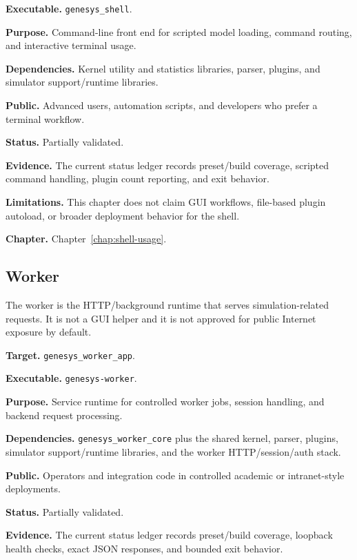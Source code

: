 \noindent\textbf{Executable.} \texttt{genesys\_shell}.

\noindent\textbf{Purpose.} Command-line front end for scripted model loading, command routing, and interactive terminal usage.

\noindent\textbf{Dependencies.} Kernel utility and statistics libraries, parser, plugins, and simulator support/runtime libraries.

\noindent\textbf{Public.} Advanced users, automation scripts, and developers who prefer a terminal workflow.

\noindent\textbf{Status.} Partially validated.

\noindent\textbf{Evidence.} The current status ledger records preset/build coverage, scripted command handling, plugin count reporting, and exit behavior.

\noindent\textbf{Limitations.} This chapter does not claim GUI workflows, file-based plugin autoload, or broader deployment behavior for the shell.

\noindent\textbf{Chapter.} Chapter~\ref{chap:shell-usage}.

\subsection{Worker}
\label{subsec:application-overview-worker}

The worker is the HTTP/background runtime that serves simulation-related
requests. It is not a GUI helper and it is not approved for public Internet
exposure by default.

\noindent\textbf{Target.} \texttt{genesys\_worker\_app}.

\noindent\textbf{Executable.} \texttt{genesys-worker}.

\noindent\textbf{Purpose.} Service runtime for controlled worker jobs, session handling, and backend request processing.

\noindent\textbf{Dependencies.} \texttt{genesys\_worker\_core} plus the shared kernel, parser, plugins, simulator support/runtime libraries, and the worker HTTP/session/auth stack.

\noindent\textbf{Public.} Operators and integration code in controlled academic or intranet-style deployments.

\noindent\textbf{Status.} Partially validated.

\noindent\textbf{Evidence.} The current status ledger records preset/build coverage, loopback health checks, exact JSON responses, and bounded exit behavior.


